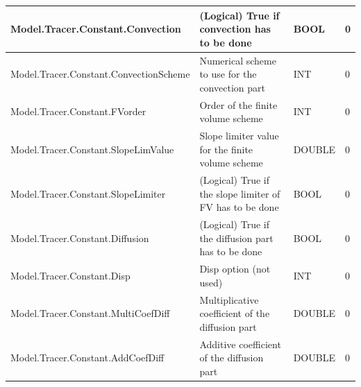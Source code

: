 \documentclass[a4paper,11pt]{article}
\begin{document}
\begin{landscape}
\begin{table}[ht]
\begin{center}
\begin{tabular}{|l|l|l|l|}
\hline Model.Tracer.Constant.Convection & (Logical) True if convection has to be done & BOOL & 0 \\
\hline Model.Tracer.Constant.ConvectionScheme & Numerical scheme to use for the convection part & INT & 0 \\
\hline Model.Tracer.Constant.FVorder & Order of the finite volume scheme & INT & 0 \\
\hline Model.Tracer.Constant.SlopeLimValue & Slope limiter value for the finite volume scheme & DOUBLE & 0 \\
\hline Model.Tracer.Constant.SlopeLimiter & (Logical) True if the slope limiter of FV has to be done & BOOL & 0 \\
\hline Model.Tracer.Constant.Diffusion & (Logical) True if the diffusion part has to be done & BOOL & 0 \\
\hline Model.Tracer.Constant.Disp & Disp option (not used) & INT & 0 \\
\hline Model.Tracer.Constant.MultiCoefDiff & Multiplicative coefficient of the diffusion part & DOUBLE & 0 \\
\hline Model.Tracer.Constant.AddCoefDiff & Additive coefficient of the
diffusion part & DOUBLE & 0 \\
\hline 
\end{tabular} 
\end{center}
\end{table}


\end{landscape}
\end{document}
